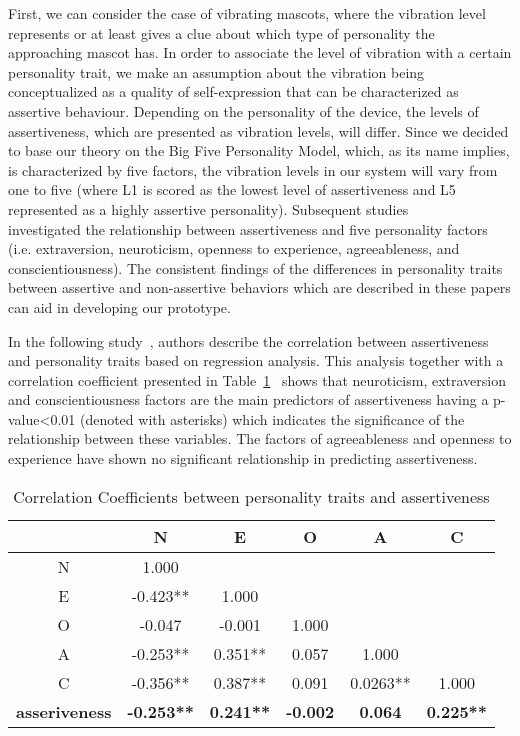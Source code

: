 \par First, we can consider the case of vibrating mascots, where the vibration level represents or at least gives a clue about which type of personality the approaching mascot has. In order to associate the level of vibration with a certain personality trait, we make an assumption about the vibration being conceptualized as a quality of self-expression that can be characterized as assertive behaviour. Depending on the personality of the device, the levels of assertiveness, which are presented as vibration levels, will differ. Since we decided to base our theory on the Big Five Personality Model, which, as its name implies, is characterized by five factors, the vibration levels in our system will vary from one to five (where L1 is scored as the lowest level of assertiveness and L5 represented as a highly assertive personality). Subsequent studies~\cite{bagherianrelationship}~\cite{kirst2011investigating}~\cite{ramanaiah1993neo}~\cite{lefevre1981assertiveness} investigated the relationship between assertiveness and five personality factors (i.e. extraversion, neuroticism, openness to experience, agreeableness, and conscientiousness). The consistent findings of the differences in personality traits between assertive and non-assertive behaviors which are described in these papers can aid in developing our prototype. 

\par In the following study~\cite{bagherianrelationship}, authors describe the correlation between assertiveness and personality traits based on regression analysis. This analysis together with a correlation coefficient presented in Table~\ref{table:assertiveness}~\cite{bagherianrelationship} shows that neuroticism, extraversion and conscientiousness factors are the main predictors of assertiveness having a p-value\textless 0.01 (denoted with asterisks) which indicates the significance of the relationship between these variables. The factors of agreeableness and openness to experience have shown no significant relationship in predicting assertiveness. 

\begin{table} [h]
\centering
\begin{tabular}{c c c c c c} 
\\
 \hline \hline
						& \textbf{N} 			&\textbf{E}		&\textbf{O}		&\textbf{A}		&\textbf{C}	\\ [0.5ex] 
 \hline
 N 						& 1.000 				&				&				&				&	\\ 
 E 						& -0.423** 			&1.000			&				&				&	\\
 O 						& -0.047 				&-0.001			&1.000			&				&	\\
 A 						& -0.253** 			&0.351**			&0.057			&1.000			&	\\
 C 						& -0.356** 			&0.387**			&0.091			&0.0263**			&1.000	\\ [1ex] 
 \hline
 \textbf{asseriveness}  		& \textbf{-0.253**}		&\textbf{0.241**}	&\textbf{-0.002}		&\textbf{0.064}		&\textbf{0.225**}	\\
 \hline \hline
 \end{tabular}
\caption{Correlation Coefficients between personality traits and assertiveness}
 \label{table:assertiveness}
 \end{table}
 
